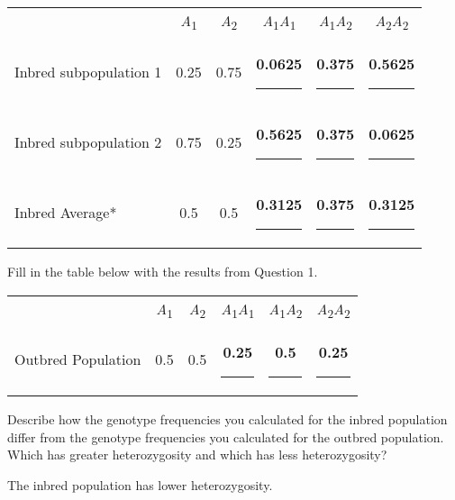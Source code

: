 \documentclass[11pt, addpoints]{exam}
\begin{document}
\begin{questions}
{\large
\begin{longtable}[c]{@{}lccccc@{}}
\toprule
& \emph{A}\textsubscript{1} &%
\emph{A}\textsubscript{2} &%
\emph{A}\textsubscript{1}\emph{A}\textsubscript{1} &%
\emph{A}\textsubscript{1}\emph{A}\textsubscript{2} &%
\emph{A}\textsubscript{2}\emph{A}\textsubscript{2} \\[0.35cm]
Inbred subpopulation 1 &%
	 0.25 &%
	 0.75 &%
	 \ifprintanswers\textbf{0.0625}\else\rule{0.5in}{0.4pt}\fi &%
	 \ifprintanswers\textbf{0.375}\else\rule{0.5in}{0.4pt}\fi &%
	 \ifprintanswers\textbf{0.5625}\else\rule{0.5in}{0.4pt}\fi \\[0.35cm] 
Inbred subpopulation 2 &%
	0.75 &%
	0.25 &%
	\ifprintanswers\textbf{0.5625}\else\rule{0.5in}{0.4pt}\fi &%
	\ifprintanswers\textbf{0.375}\else\rule{0.5in}{0.4pt}\fi &%
	\ifprintanswers\textbf{0.0625}\else\rule{0.5in}{0.4pt}\fi \\[0.35cm]
Inbred Average* &%
	0.5 &%
	0.5 &%
	\ifprintanswers\textbf{0.3125}\else\rule{0.5in}{0.4pt}\fi &%
	\ifprintanswers\textbf{0.375}\else\rule{0.5in}{0.4pt}\fi &%
	\ifprintanswers\textbf{0.3125}\else\rule{0.5in}{0.4pt}\fi \tabularnewline
\bottomrule
\end{longtable}
}%


\question
Fill in the table below with the results from Question 1.

{\large
\begin{longtable}[c]{@{}lccccc@{}}
\toprule
& \emph{A}\textsubscript{1} &%
 \emph{A}\textsubscript{2} &%
 \emph{A}\textsubscript{1}\emph{A}\textsubscript{1} &%
 \emph{A}\textsubscript{1}\emph{A}\textsubscript{2} &%
 \emph{A}\textsubscript{2}\emph{A}\textsubscript{2} \\[0.35cm]
 Outbred Population &%
 	0.5 &%
	0.5 &%
	\ifprintanswers\textbf{0.25}\else\rule{0.5in}{0.4pt}\fi &%
	\ifprintanswers\textbf{0.5}\else\rule{0.5in}{0.4pt}\fi &%
	\ifprintanswers\textbf{0.25}\else\rule{0.5in}{0.4pt}\fi \tabularnewline
\bottomrule
\end{longtable}
}%

\question[1]
Describe how the genotype frequencies you calculated for
the inbred population differ from the genotype frequencies you calculated for
the outbred population. Which has greater heterozygosity and which has less heterozygosity?

\begin{minipage}[t][1.5in]{\textwidth}%
\begin{solution}
The inbred population has lower heterozygosity.
\end{solution}
\end{minipage}


\end{questions}
\end{document}
